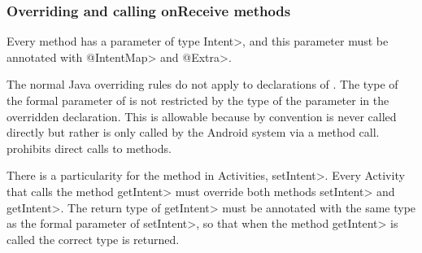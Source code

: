 \subsubsection{Overriding and calling onReceive methods\label{override-onreceive}}
Every \onReceive{} method has a parameter of type \<Intent>, and this
parameter must be annotated with \<@IntentMap> and \<@Extra>.

The normal Java overriding rules do not apply to declarations of \onReceive{}. The
type of the formal parameter of \onReceive{} is not restricted by the type of the
parameter in the overridden declaration. This is allowable because by convention
\onReceive{} is never called directly but rather is only called by the Android
system via a \sendIntent{} method call. \TheIntentChecker{} prohibits direct
calls to \onReceive{} methods.

There is a particularity for the \onReceive{} method in Activities, \<setIntent>.
Every Activity that calls the method \<getIntent> must override both methods
\<setIntent> and \<getIntent>. The return type of \<getIntent> must be annotated
with the same type as the formal parameter of \<setIntent>, so that when the
method \<getIntent> is called the correct type is returned.

